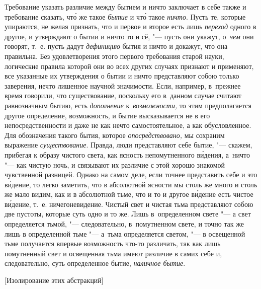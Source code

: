 Требование указать различие между бытием и ничто заключает в себе также и
требование сказать, чт\'{о} же такое {\em бытие} и чт\'{о} такое {\em ничто}.
Пусть те, которые упираются, не желая признать, что и первое и второе есть лишь
{\em переход} одного в другое, и утверждают о бытии и ничто то и сё, "--- пусть
они укажут, о~{\em чем} они говорят, т.~е. пусть дадут {\em дефиницию} бытия и
ничто и докажут, что она правильна. Без удовлетворения этого первого требования
старой науки, логические правила которой они во всех других случаях признают и
применяют, все указанные их утверждения о бытии и ничто представляют собою
только заверения, нечто лишенное научной значимости. Если, например, в~прежнее
время говорили, что существование, поскольку его в~данном случае считают
равнозначным бытию, есть {\em дополнение} к~{\em возможности,} то этим
предполагается другое определение, возможность, и бытие высказывается не в его
непосредственности и даже не как нечто самостоятельное, а как обусловленное.
Для обозначения такого бытия, которое {\em опосредствовано,} мы сохраним
выражение {\em существование}. Правда, люди представляют себе бытие, "---
скажем, прибегая к образу чистого света, как ясность непомутненного
в\'{и}дения, а~ничто "--- как чистую ночь, и связывают их различие с этой
хорошо знакомой чувственной разницей. Однако на самом деле, если точнее
представить себе и это в\'{и}дение, то легко заметить, что в абсолютной ясности
мы столь же много и столь же мало видим, как и в абсолютной тьме, что и то и
другое в\'{и}дение есть чистое в\'{и}дение, т.~е. ничегоневидение. Чистый свет
и чистая тьма представляют собою две пустоты, которые суть одно и то же. Лишь
в~определенном свете "--- а свет определяется тьмой, "--- следовательно,
в~помутненном свете, и точно так же лишь в определенной тьме "--- а~тьма
определяется светом, "--- в освещенной тьме получается впервые возможность
что-то различать, так как лишь помутненный свет и освещенная тьма имеют
различие в самих себе и, следовательно, суть определенное бытие,
{\em наличное бытие}.

%
{[Изолирование этих абстракций]}

